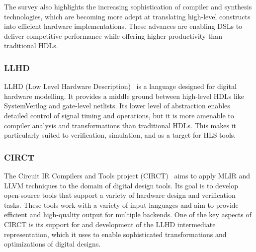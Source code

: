 The survey also highlights the increasing sophistication of compiler and synthesis technologies, which are becoming more adept at translating high-level constructs into efficient hardware implementations. These advances are enabling DSLs to deliver competitive performance while offering higher productivity than traditional HDLs.

\subsubsection{LLHD}
LLHD (Low Level Hardware Description) \cite{mlir} is a language designed for digital hardware modelling. It provides a middle ground between high-level HDLs like SystemVerilog and gate-level netlists. Its lower level of abstraction enables detailed control of signal timing and operations, but it is more amenable to compiler analysis and transformations than traditional HDLs. This makes it particularly suited to verification, simulation, and as a target for HLS tools.

\subsubsection{CIRCT}
The Circuit IR Compilers and Tools project (CIRCT) \cite{circt} aims to apply MLIR and LLVM techniques to the domain of digital design tools. Its goal is to develop open-source tools that support a variety of hardware design and verification tasks. These tools work with a variety of input languages and aim to provide efficient and high-quality output for multiple backends. One of the key aspects of CIRCT is its support for and development of the LLHD intermediate representation, which it uses to enable sophisticated transformations and optimizations of digital designs.